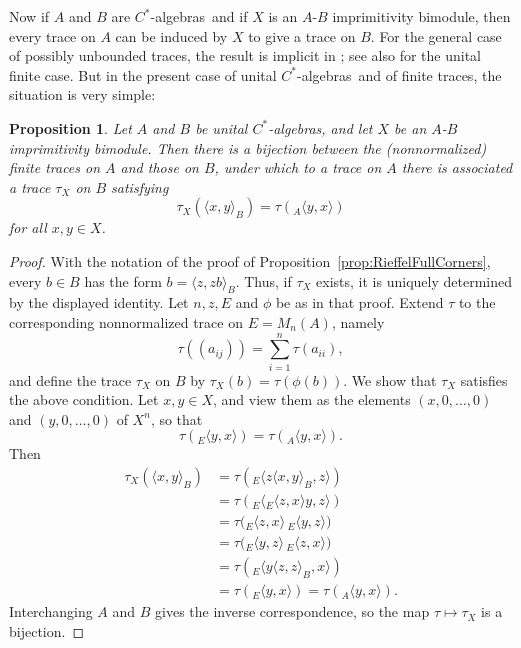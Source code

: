 \documentclass{book}
\newtheorem{proposition}[definition]{Proposition}
\def\cstars{\(C^*\)-algebras}
\begin{document}
Now if \(A\) and \(B\) are \cstars\ and if \(X\) is an \(A\)-\(B\) imprimitivity bimodule,
then every trace on \(A\) can be induced by \(X\) to give a trace on \(B\).
For the general case of possibly unbounded traces, the result is implicit in
\cite[Proposition~28]{Green1978}; see also
\cite[Proposition~2.2]{Rieffel1981} for the unital finite case.
But in the present case of unital \cstars\ and of finite traces, the situation is very simple:
\begin{proposition}\label{prop:Rieffel22}
  Let \(A\) and \(B\) be unital \cstars, and let \(X\) be an
  \(A\)-\(B\) imprimitivity bimodule. Then there is a bijection
  between the (nonnormalized) finite traces on \(A\) and those on \(B\),
  under which to a trace on \(A\) there is associated a trace \(\tau_X\) on \(B\)
  satisfying
  \[
    \tau_X(\langle x,y\rangle_B)=\tau({}_A\langle y,x\rangle)
  \]
  for all \(x,y\in X\).
\end{proposition}
\begin{proof}
  With the notation of the proof of Proposition~\ref{prop:RieffelFullCorners},
  every \(b\in B\) has the form \(b=\langle z,zb\rangle_B\). Thus, if
  \(\tau_X\) exists, it is uniquely determined by the displayed identity. Let
  \(n,z,E\) and \(\phi\) be as in that proof. Extend \(\tau\) to the corresponding
  nonnormalized trace on \(E=M_n(A)\), namely
  \[
    \tau((a_{ij}))=\sum_{i=1}^n\tau(a_{ii}),
  \]
  and define the trace \(\tau_X\) on \(B\) by
  \(\tau_X(b)=\tau(\phi(b))\). We
  show that \(\tau_X\) satisfies the above condition. Let \(x,y\in X\), and view 
  them as the elements \((x,0,\ldots,0)\) and \((y,0,\ldots,0)\) of \(X^n\), so that
  \[
    \tau({}_E\langle y,x\rangle)=\tau({}_A\langle y,x\rangle).
  \]
  Then
  \begin{align*}
    \tau_X(\langle x,y\rangle_B)
    &=\tau({}_E\langle z\langle x,y\rangle_B,z\rangle)\\
    &=\tau({}_E\langle {}_E\langle z,x\rangle y,z\rangle)\\
    &=\tau\bigl({}_E\langle z,x\rangle\,{}_E\langle y,z\rangle\bigr)\\
    &=\tau\bigl({}_E\langle y,z\rangle\,{}_E\langle z,x\rangle\bigr)\\
    &=\tau({}_E\langle y\langle z,z\rangle_B,x\rangle)\\
    &=\tau({}_E\langle y,x\rangle)
      =\tau({}_A\langle y,x\rangle).
  \end{align*}
  Interchanging \(A\) and \(B\) gives the inverse correspondence, so the map
  \(\tau\mapsto\tau_X\) is a bijection.
\end{proof}
\end{document}
